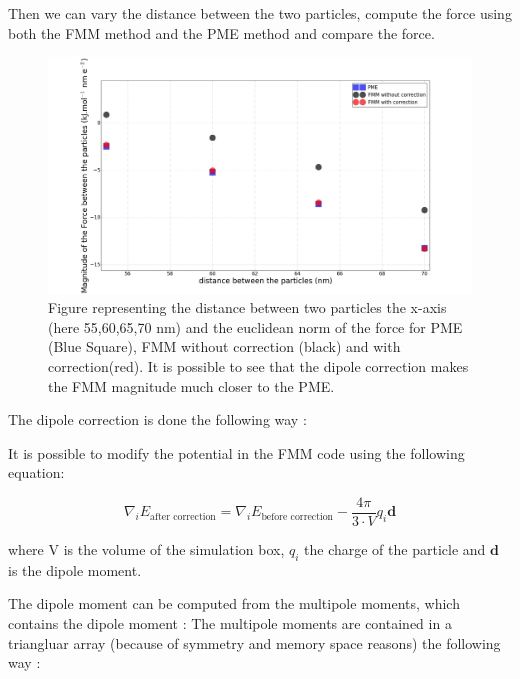 \documentclass[11pt,twoside,a4paper]{report}
\begin{document}
	Then we can vary the distance between the two particles, compute the force using both the FMM method and the PME method and compare the force.	
	\begin{figure}
	   \includegraphics[scale=0.2]{dipoleCorrection}
    \centering 
    \caption{Figure representing the distance between two particles the x-axis (here 55,60,65,70 nm) and the  euclidean norm of the force for PME (Blue Square), FMM without correction (black) and with correction(red).
     It is possible to see that the dipole correction makes the FMM magnitude much closer to the PME.}    
   \end{figure}	
The dipole correction is done the following way :

It is possible to modify the potential in the FMM code using the following equation:

\begin{equation}
\label{eq:dipoleCorrection}
\nabla_iE_{\text{after correction}} = \nabla_iE_{\text{before correction}} - \frac{4\pi}{3 \cdot V} q_i \textbf{d}
\end{equation}	
	
	where V is the volume of the simulation box, $q_i$ the charge of the particle and $\textbf{d}$ is the dipole moment.

The dipole moment can be computed from the multipole moments, which contains the dipole moment : The multipole moments are contained in a triangluar array (because of symmetry and memory space reasons) the following way :
\end{document}
